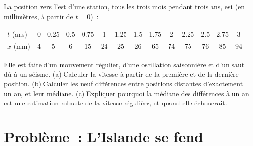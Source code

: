 \begin{exercise}[$\star\star\star$]\label{exo:b1:plate-kinematics:12}
La position vers l'est d'une station, tous les trois mois pendant trois ans, est
(en millimètres, à partir de $t = 0$)~:
\begin{center}\small
\begin{tabular}{l*{13}{c}}
\hline
$t$ (ans) & 0 & 0.25 & 0.5 & 0.75 & 1 & 1.25 & 1.5 & 1.75 & 2 & 2.25 & 2.5 & 2.75 & 3\\
$x$ (mm) & 4 & 5 & 6 & 15 & 24 & 25 & 26 & 65 & 74 & 75 & 76 & 85 & 94\\
\hline
\end{tabular}
\end{center}
Elle est faite d'un mouvement régulier, d'une oscillation saisonnière et d'un saut dû à un
séisme. (a) Calculer la vitesse à partir de la première et de la dernière position.
(b) Calculer les neuf différences entre positions distantes d'exactement un an, et
leur médiane. (c) Expliquer pourquoi la médiane des différences à un an est une estimation robuste
de la vitesse régulière, et quand elle échouerait.
\end{exercise}

\section{Problème~: L'Islande se fend}

